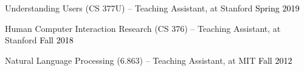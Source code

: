 
Understanding Users (CS 377U) -- Teaching Assistant, at Stanford \hfill \textcolor{black}{Spring 2019}

Human Computer Interaction Research (CS 376) -- Teaching Assistant, at Stanford \hfill \textcolor{black}{Fall 2018}

Natural Language Processing (6.863) -- Teaching Assistant, at MIT \hfill \textcolor{black}{Fall 2012}\\






